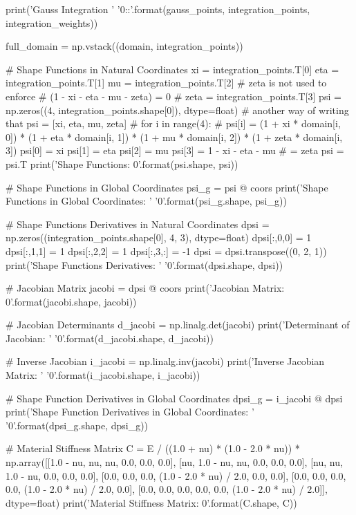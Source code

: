 \documentclass[10pt,b5paper,titlepage]{book}
\begin{document}
\begin{python}
    print('Gauss Integration '
          '{0}:\nWeights:'.format(gauss_points,
                                            integration_points,
                                            integration_weights))

    full_domain = np.vstack((domain, integration_points))

    # Shape Functions in Natural Coordinates
    xi = integration_points.T[0]
    eta = integration_points.T[1]
    mu = integration_points.T[2]
    # zeta is not used to enforce
    # (1 - xi - eta - mu - zeta) = 0
    # zeta = integration_points.T[3]
    psi = np.zeros((4, integration_points.shape[0]), dtype=float)
    # another way of writing that psi = [xi, eta, mu, zeta]
    # for i in range(4):
    #     psi[i] = (1 + xi * domain[i, 0]) * (1 + eta * domain[i, 1]) * (1 + mu * domain[i, 2]) * (1 + zeta * domain[i, 3])
    psi[0] = xi
    psi[1] = eta
    psi[2] = mu
    psi[3] = 1 - xi - eta - mu  # = zeta
    psi = psi.T
    print('Shape Functions: {0}'.format(psi.shape, psi))

    # Shape Functions in Global Coordinates
    psi_g = psi @ coors
    print('Shape Functions in Global Coordinates: '
          '{0}'.format(psi_g.shape, psi_g))

    # Shape Functions Derivatives in Natural Coordinates
    dpsi = np.zeros((integration_points.shape[0], 4, 3), dtype=float)
    dpsi[:,0,0] = 1
    dpsi[:,1,1] = 1
    dpsi[:,2,2] = 1
    dpsi[:,3,:] = -1
    dpsi = dpsi.transpose((0, 2, 1))
    print('Shape Functions Derivatives: '
          '{0}'.format(dpsi.shape, dpsi))

    # Jacobian Matrix
    jacobi = dpsi @ coors
    print('Jacobian Matrix: {0}'.format(jacobi.shape, jacobi))

    # Jacobian Determinants
    d_jacobi = np.linalg.det(jacobi)
    print('Determinant of Jacobian: '
          '{0}'.format(d_jacobi.shape, d_jacobi))

    # Inverse Jacobian
    i_jacobi = np.linalg.inv(jacobi)
    print('Inverse Jacobian Matrix: '
          '{0}'.format(i_jacobi.shape, i_jacobi))

    # Shape Function Derivatives in Global Coordinates
    dpsi_g = i_jacobi @ dpsi
    print('Shape Function Derivatives in Global Coordinates: '
          '{0}'.format(dpsi_g.shape, dpsi_g))

    # Material Stiffness Matrix
    C = E / ((1.0 + nu) * (1.0 - 2.0 * nu)) *
        np.array([[1.0 - nu, nu, nu, 0.0, 0.0, 0.0],
                  [nu, 1.0 - nu, nu, 0.0, 0.0, 0.0],
                  [nu, nu, 1.0 - nu, 0.0, 0.0, 0.0],
                  [0.0, 0.0, 0.0, (1.0 - 2.0 * nu) / 2.0, 0.0, 0.0],
                  [0.0, 0.0, 0.0, 0.0, (1.0 - 2.0 * nu) / 2.0, 0.0],
                  [0.0, 0.0, 0.0, 0.0, 0.0, (1.0 - 2.0 * nu) / 2.0]],
                  dtype=float)
    print('Material Stiffness Matrix: {0}'.format(C.shape, C))


\end{python}
\end{document}
